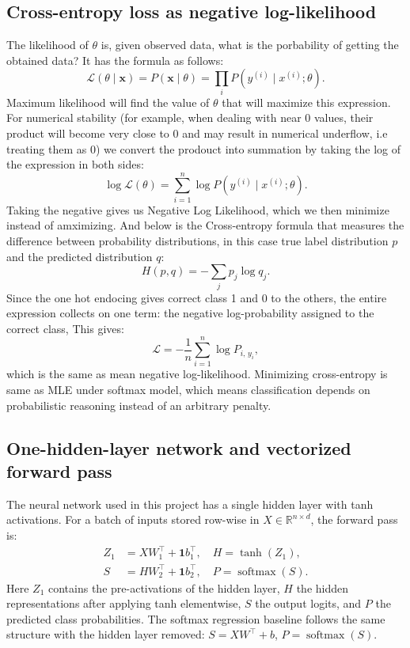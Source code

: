 \documentclass[11pt]{article}
\begin{document}
\subsection{Cross-entropy loss as negative log-likelihood}

The likelihood of $\theta$ is, given observed data, what is the porbability of getting the obtained data? It has the formula as follows:
\begin{equation}
    \mathcal{L}(\theta \mid \mathbf{x}) = P(\mathbf{x} \mid \theta)
    = \prod_{i} P\!\left(y^{(i)} \mid x^{(i)}; \theta\right).
\end{equation}
Maximum likelihood will find the value of $\theta$ that will maximize this expression. For numerical stability (for example, when dealing with near 0 values, their product will become very close to 0 and may result in numerical underflow, i.e treating them as 0) we convert the prodouct into summation by taking the log of the expression in both sides:
\begin{equation}
    \log \mathcal{L}(\theta) = \sum_{i=1}^{n} \log P\!\left(y^{(i)} \mid x^{(i)}; \theta\right).
\end{equation}
Taking the negative gives us Negative Log Likelihood, which we then minimize instead of amximizing. And below is the Cross-entropy formula that measures the difference between probability distributions, in this case true label distribution $p$ and the predicted distribution $q$:
\begin{equation}
    H(p,q) = -\sum_j p_j \log q_j.
\end{equation}
Since the one hot endocing gives correct class 1 and 0 to the others, the entire expression collects on one term: the negative log-probability assigned to the correct class, This gives:
\begin{equation}
    \mathcal{L} = -\frac{1}{n}\sum_{i=1}^{n} \log P_{i,\,y_i},
\end{equation}
which is the same as mean negative log-likelihood. Minimizing cross-entropy is same as MLE under softmax model, which means classification depends on probabilistic reasoning instead of an arbitrary penalty.

\subsection{One-hidden-layer network and vectorized forward pass}
\label{sec:arch}

The neural network used in this project has a single hidden layer with tanh activations.
For a batch of inputs stored row-wise in $X \in \mathbb{R}^{n \times d}$, the forward
pass is:
\begin{align}
    Z_1 &= X W_1^\top + \mathbf{1}b_1^\top, \quad
    H   = \tanh(Z_1), \\
    S   &= H W_2^\top + \mathbf{1}b_2^\top, \quad
    P   = \operatorname{softmax}(S).
\end{align}
Here $Z_1$ contains the pre-activations of the hidden layer, $H$ the hidden
representations after applying tanh elementwise, $S$ the output logits, and $P$ the
predicted class probabilities. The softmax regression baseline follows the same structure
with the hidden layer removed: $S = XW^\top + b$, $P = \operatorname{softmax}(S)$.
\end{document}
